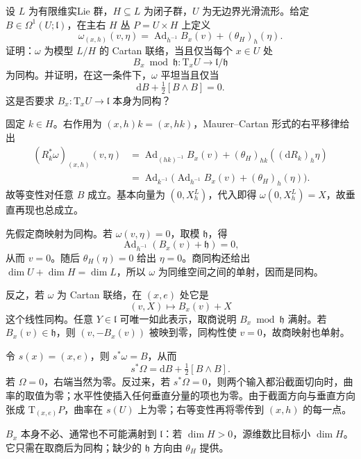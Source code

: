 \begin{exercise}\label{g1:ex:cartan-trivial-bundle}
	设 \(L\) 为有限维实Lie 群，\(H\subseteq L\) 为闭子群，\(U\) 为无边界光滑流形。给定 \(B\in\Omega^1(U;\mathfrak l)\)，在主右 \(H\) 丛 \(P=U\times H\) 上定义
	\[
		\omega_{(x,h)}(v,\eta)
		=\operatorname{Ad}_{h^{-1}}B_x(v)+(\theta_H)_h(\eta).
	\]
	证明：\(\omega\) 为模型 \(L/H\) 的 Cartan 联络，当且仅当每个 \(x\in U\) 处
	\[
		B_x\bmod\mathfrak h:\mathrm{T}_xU\longrightarrow\mathfrak l/\mathfrak h
	\]
	为同构。并证明，在这一条件下，\(\omega\) 平坦当且仅当
	\[
		\mathrm{d}B+\tfrac12[B\wedge B]=0.
	\]
	这是否要求 \(B_x:\mathrm{T}_xU\to\mathfrak l\) 本身为同构？
\end{exercise}
\begin{solution}
	固定 \(k\in H\)。右作用为 \((x,h)k=(x,hk)\)，Maurer--Cartan 形式的右平移律给出
	\[
		\begin{aligned}
			(R_k^*\omega)_{(x,h)}(v,\eta)
			&=\operatorname{Ad}_{(hk)^{-1}}B_x(v)
			+(\theta_H)_{hk}((\mathrm{d}R_k)_h\eta)\\
			&=\operatorname{Ad}_{k^{-1}}
			\bigl(\operatorname{Ad}_{h^{-1}}B_x(v)+(\theta_H)_h(\eta)\bigr).
		\end{aligned}
	\]
	故等变性对任意 \(B\) 成立。基本向量为 \((0,X_h^L)\)，代入即得 \(\omega(0,X_h^L)=X\)，故垂直再现也总成立。

	先假定商映射为同构。若 \(\omega(v,\eta)=0\)，取模 \(\mathfrak h\)，得
	\[
		\operatorname{Ad}_{h^{-1}}(B_x(v)+\mathfrak h)=0,
	\]
	从而 \(v=0\)。随后 \(\theta_H(\eta)=0\) 给出 \(\eta=0\)。商同构还给出 \(\dim U+\dim H=\dim L\)，所以 \(\omega\) 为同维空间之间的单射，因而是同构。

	反之，若 \(\omega\) 为 Cartan 联络，在 \((x,e)\) 处它是
	\[
		(v,X)\longmapsto B_x(v)+X
	\]
	这个线性同构。任意 \(Y\in\mathfrak l\) 可唯一如此表示，取商说明 \(B_x\bmod\mathfrak h\) 满射。若 \(B_x(v)\in\mathfrak h\)，则 \((v,-B_x(v))\) 被映到零，同构性使 \(v=0\)，故商映射也单射。

	令 \(s(x)=(x,e)\)，则 \(s^*\omega=B\)，从而
	\[
		s^*\Omega=\mathrm{d}B+\tfrac12[B\wedge B].
	\]
	若 \(\Omega=0\)，右端当然为零。反过来，若 \(s^*\Omega=0\)，则两个输入都沿截面切向时，曲率的取值为零；水平性使插入任何垂直分量的项也为零。由于截面方向与垂直方向张成 \(\mathrm{T}_{(x,e)}P\)，曲率在 \(s(U)\) 上为零；右等变性再将零传到 \((x,h)\) 的每一点。

	\(B_x\) 本身不必、通常也不可能满射到 \(\mathfrak l\)：若 \(\dim H>0\)，源维数比目标小 \(\dim H\)。它只需在取商后为同构；缺少的 \(\mathfrak h\) 方向由 \(\theta_H\) 提供。
\end{solution}

